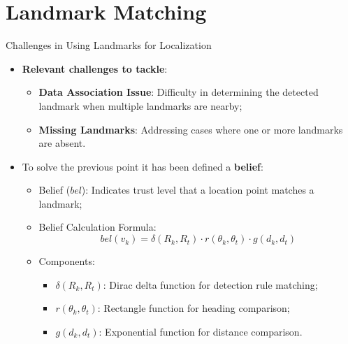\section{Landmark Matching}
\begin{frame}{Challenges in Using Landmarks for Localization}
    \begin{itemize}
        \item \textbf{Relevant challenges to tackle}:
        \begin{itemize} 
            \item \textbf{Data Association Issue}: Difficulty in determining the detected landmark when multiple landmarks are nearby;
            \item \textbf{Missing Landmarks}: Addressing cases where one or more landmarks are absent.
        \end{itemize}
        \item To solve the previous point it has been defined a \textbf{belief}:
        \begin{itemize}
            \item Belief (\( bel \)): Indicates trust level that a location point matches a landmark;
            \item Belief Calculation Formula:
            \[
                bel(v_k) = \delta(R_k, R_t) \cdot r(\theta_k, \theta_t) \cdot g(d_k, d_t)
            \]
            \item Components:
                  \begin{itemize}
                    \item \( \delta(R_k, R_t) \): Dirac delta function for detection rule matching;
                    \item \( r(\theta_k, \theta_t) \): Rectangle function for heading comparison;
                    \item \( g(d_k, d_t) \): Exponential function for distance comparison.
                \end{itemize}
        \end{itemize}
    \end{itemize}
\end{frame}


